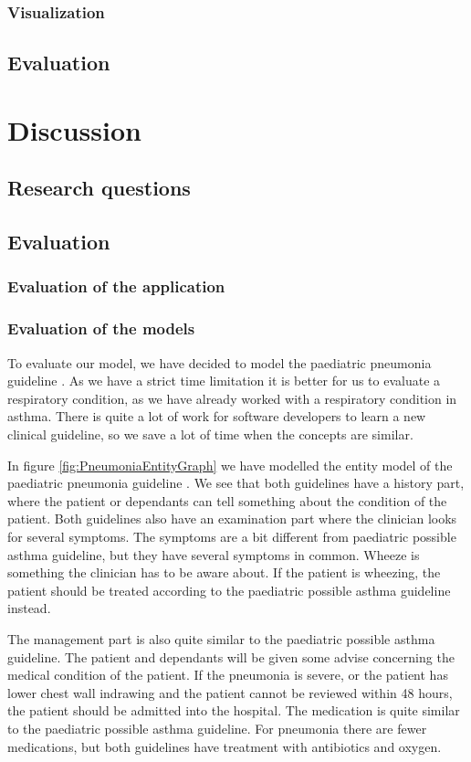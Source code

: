 \documentclass[a4paper,12pt]{book}
\begin{document}
\subsection{Visualization}
\section{Evaluation}



\chapter{Discussion}
\section{Research questions}
\section{Evaluation}
\subsection{Evaluation of the application}
\subsection{Evaluation of the models}
To evaluate our model, we have decided to model the paediatric pneumonia guideline \parencite{RepublicofKeny2016}. As we have a strict time limitation it is better for us to evaluate a respiratory condition, as we have already worked with a respiratory condition in asthma. There is quite a lot of work for software developers to learn a new clinical guideline, so we save a lot of time when the concepts are similar.

In figure \ref{fig:PneumoniaEntityGraph} we have modelled the entity model of the paediatric pneumonia guideline \parencite{RepublicofKeny2016}. We see that both guidelines have a history part, where the patient or dependants can tell something about the condition of the patient. Both guidelines also have an examination part where the clinician looks for several symptoms. The symptoms are a bit different from paediatric possible asthma guideline, but they have several symptoms in common. Wheeze is something the clinician has to be aware about. If the patient is wheezing, the patient should be treated according to the paediatric possible asthma guideline instead.

The management part is also quite similar to the paediatric possible asthma guideline. The patient and dependants will be given some advise concerning the medical condition of the patient. If the pneumonia is severe, or the patient has lower chest wall indrawing and the patient cannot be reviewed within 48 hours, the patient should be admitted into the hospital. The medication is quite similar to the paediatric possible asthma guideline. For pneumonia there are fewer medications, but both guidelines have treatment with antibiotics and oxygen.
\end{document}

